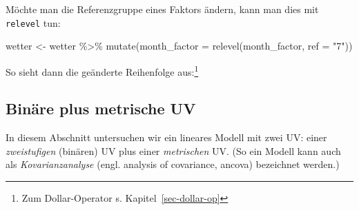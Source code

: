 \documentclass[
  letterpaper,
]{scrbook}
\newenvironment{Shaded}{\begin{snugshade}}{\end{snugshade}}
\newcommand{\AttributeTok}[1]{\textcolor[rgb]{0.40,0.45,0.13}{#1}}
\newcommand{\DocumentationTok}[1]{\textcolor[rgb]{0.37,0.37,0.37}{\textit{#1}}}
\newcommand{\FunctionTok}[1]{\textcolor[rgb]{0.28,0.35,0.67}{#1}}
\newcommand{\NormalTok}[1]{\textcolor[rgb]{0.00,0.23,0.31}{#1}}
\newcommand{\OtherTok}[1]{\textcolor[rgb]{0.00,0.23,0.31}{#1}}
\newcommand{\SpecialCharTok}[1]{\textcolor[rgb]{0.37,0.37,0.37}{#1}}
\newcommand{\StringTok}[1]{\textcolor[rgb]{0.13,0.47,0.30}{#1}}
\theoremstyle{definition}
\theoremstyle{definition}
\theoremstyle{definition}
\theoremstyle{remark}
\begin{document}
Möchte man die Referenzgruppe eines Faktors ändern, kann man dies mit
\texttt{relevel} tun:

\begin{Shaded}
\begin{Highlighting}[]
\NormalTok{wetter }\OtherTok{\textless{}{-}}
\NormalTok{  wetter }\SpecialCharTok{\%\textgreater{}\%} 
  \FunctionTok{mutate}\NormalTok{(}\AttributeTok{month\_factor =} \FunctionTok{relevel}\NormalTok{(month\_factor, }\AttributeTok{ref =} \StringTok{"7"}\NormalTok{))}
\end{Highlighting}
\end{Shaded}

So sieht dann die geänderte Reihenfolge aus:\footnote{Zum
  Dollar-Operator s. Kapitel~\ref{sec-dollar-op}}

\begin{Shaded}
\end{Shaded}

\subsection{Binäre plus metrische UV}\label{sec-faktorvar}

In diesem Abschnitt untersuchen wir ein lineares Modell mit zwei UV:
einer \emph{zweistufigen} (binären) UV plus einer \emph{metrischen} UV.
(So ein Modell kann auch als \emph{Kovarianzanalyse} (engl. analysis of
covariance, ancova) bezeichnet werden.)
\end{document}
